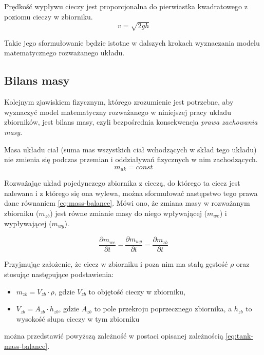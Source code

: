 \begin{torricelli}
    Prędkość wypływu cieczy jest proporcjonalna do pierwiastka kwadratowego z poziomu cieczy w zbiorniku.
    \begin{equation}\label{eq:torricelli}
    v = \sqrt{2gh}
    \end{equation}
\end{torricelli}
Takie jego sformułowanie będzie istotne w dalszych krokach wyznaczania modelu matematycznego rozważanego układu.


\subsection{Bilans masy}
\label{sub:plyny-bilans}

Kolejnym zjawiskiem fizycznym, którego zrozumienie jest potrzebne, aby wyznaczyć model matematyczny rozważanego w niniejszej pracy układu zbiorników, jest bilans masy, czyli bezpośrednia konsekwencja \emph{prawa zachowania masy}.

\begin{mass}
    Masa układu ciał (suma mas wszystkich ciał wchodzących w skład tego układu) nie zmienia się podczas przemian i oddziaływań fizycznych w nim zachodzących.
    \begin{equation}\label{eq:mass-conservation}
        m_{uk} = const
    \end{equation}
\end{mass}

Rozważając układ pojedynczego zbiornika z cieczą, do którego ta ciecz jest nalewana i z którego się ona wylewa, można sformułować następstwo tego prawa dane równaniem \ref{eq:mass-balance}. Mówi ono, że zmiana masy w rozważanym zbiorniku ($m_{zb}$) jest równe zmianie masy do niego wpływającej ($m_{we}$) i wypływającej ($m_{wy}$).

\begin{equation}\label{eq:mass-balance}
    \frac{\partial m_{we}}{\partial t} - \frac{\partial m_{wy}}{\partial t} =\frac{\partial m_{zb}}{\partial t}
\end{equation}

Przyjmując założenie, że ciecz w zbiorniku i poza nim ma stałą gęstość $\rho$ oraz stosując następujące podstawienia:
\begin{itemize}
    \item $m_{zb} = V_{zb}\cdot\rho$, gdzie $V_{zb}$ to objętość cieczy w zbiorniku,
    \item $V_{zb} = A_{zb} \cdot h_{zb}$, gdzie $A_{zb}$ to pole przekroju poprzecznego zbiornika, a $h_{zb}$ to wysokość słupa cieczy w tym zbiorniku
\end{itemize}
można przedstawić powyższą zależność w postaci opisanej zależnością \ref{eq:tank-mass-balance}.

